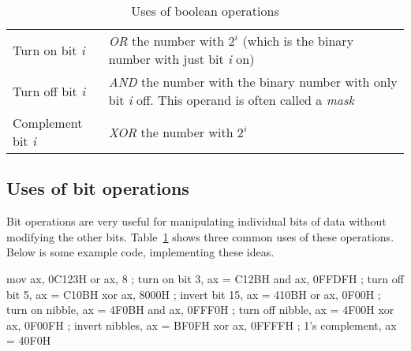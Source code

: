 \begin{table}
\begin{tabular}{lp{3in}}
Turn on bit \emph{i} & \emph{OR} the number with $2^i$ (which is
                              the binary number with just bit \emph{i} on) \\
Turn off bit \emph{i} & \emph{AND} the number with the binary number with
                              only bit \emph{i} off. This operand is often
                  	      called a \emph{mask} \\
Complement bit \emph{i} & \emph{XOR} the number with $2^i$
\end{tabular}
\caption{Uses of boolean operations \label{tab:bool}}
\end{table}

\subsection{Uses of bit operations}

Bit operations are very useful for manipulating individual bits of data
without modifying the other bits. Table~\ref{tab:bool} shows three common
uses of these operations. Below is some example code, implementing these
ideas.
\begin{AsmCodeListing}[frame=none]
      mov    ax, 0C123H
      or     ax, 8           ; turn on bit 3,   ax = C12BH
      and    ax, 0FFDFH      ; turn off bit 5,  ax = C10BH
      xor    ax, 8000H       ; invert bit 15,   ax = 410BH
      or     ax, 0F00H       ; turn on nibble,  ax = 4F0BH
      and    ax, 0FFF0H      ; turn off nibble, ax = 4F00H
      xor    ax, 0F00FH      ; invert nibbles,  ax = BF0FH
      xor    ax, 0FFFFH      ; 1's complement,  ax = 40F0H
\end{AsmCodeListing}

